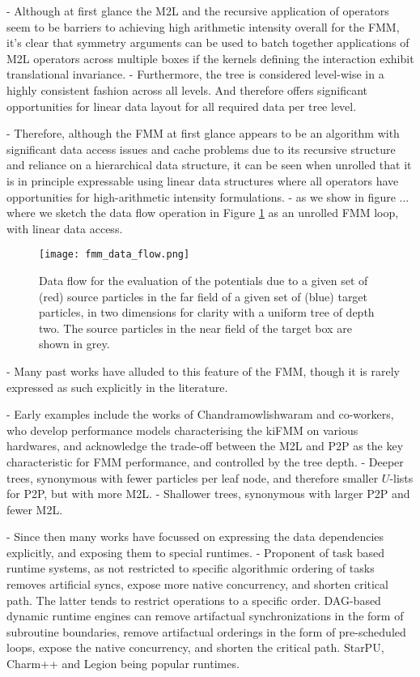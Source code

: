 - Although at first glance the M2L and the recursive application of operators seem to be barriers to achieving high arithmetic intensity overall for the FMM, it's clear that symmetry arguments can be used to batch together applications of M2L operators across multiple boxes if the kernels defining the interaction exhibit translational invariance.
- Furthermore, the tree is considered level-wise in a highly consistent fashion across all levels. And therefore offers significant opportunities for linear data layout for all required data per tree level.

- Therefore, although the FMM at first glance appears to be an algorithm with significant data access issues and cache problems due to its recursive structure and reliance on a hierarchical data structure, it can be seen when unrolled that it is in principle expressable using linear data structures where all operators have opportunities for high-arithmetic intensity formulations.
- as we show in figure ... where we sketch the data flow operation in Figure \ref{fig:chpt:fmm:data_flow} as an unrolled FMM loop, with linear data access.

\begin{figure}[h]
    \texttt{[image: fmm\_data\_flow.png]}
    \caption{Data flow for the evaluation of the potentials due to a given set of (red) source particles in the far field of a given set of (blue) target particles, in two dimensions for clarity with a uniform tree of depth two. The source particles in the near field of the target box are shown in grey.}
    \label{fig:chpt:fmm:data_flow}
\end{figure}

- Many past works have alluded to this feature of the FMM, though it is rarely expressed as such explicitly in the literature.

- Early examples include the works of Chandramowlishwaram and co-workers, who develop performance models characterising the kiFMM on various hardwares, and acknowledge the trade-off between the M2L and P2P as the key characteristic for FMM performance, and controlled by the tree depth.
- Deeper trees, synonymous with fewer particles per leaf node, and therefore smaller $U$-lists for P2P, but with more M2L.
- Shallower trees, synonymous with larger P2P and fewer M2L.

- Since then many works have focussed on expressing the data dependencies explicitly, and exposing them to special runtimes. - Proponent of task based runtime systems, as not restricted to specific algorithmic ordering of tasks removes artificial syncs, expose more native concurrency, and shorten critical path. The latter tends to restrict operations to a specific order. DAG-based dynamic runtime engines can remove artifactual synchronizations in the form of subroutine boundaries, remove artifactual orderings in the form of pre-scheduled loops, expose the native concurrency, and shorten the critical path. StarPU, Charm++ and Legion being popular runtimes.

